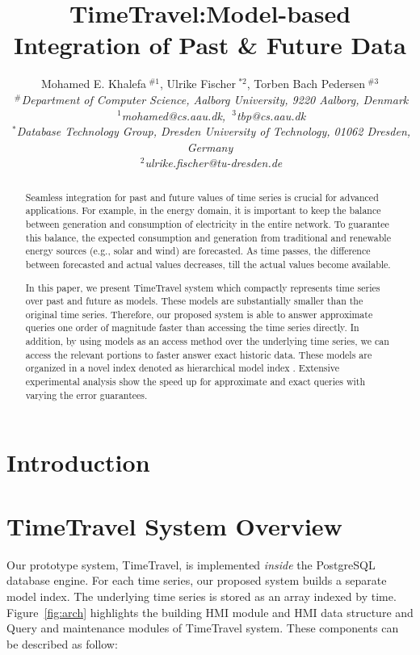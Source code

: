 \documentclass{sigmod}
\title{TimeTravel:Model-based Integration of Past \& Future Data}
\author{{Mohamed E. Khalefa{\small $~^{\#1}$}, Ulrike Fischer{\small $~^{*2}$}, Torben Bach Pedersen{\small $~^{\#3}$} }
\vspace{1.6mm}\\
\fontsize{10}{10}\selectfont\itshape
$~^{\#}$Department of Computer Science, Aalborg University, 9220 Aalborg, Denmark\\
\fontsize{9}{9}\selectfont\ttfamily\upshape
$~^{1}$mohamed@cs.aau.dk, 
$~^{3}$tbp@cs.aau.dk
\vspace{1.2mm}\\
\fontsize{10}{10}\selectfont\rmfamily\itshape
$~^{*}$Database Technology Group, Dresden University of Technology, 01062 Dresden, Germany\\
\fontsize{9}{9}\selectfont\ttfamily\upshape
$~^{2}$ulrike.fischer@tu-dresden.de
}
\newcommand{\LNs}{hierarchical model index }
\begin{document}
\maketitle
\begin{abstract}

Seamless integration for past and future values of time series is crucial for advanced applications. For example, in the energy domain, it is important to keep the balance between generation and consumption of electricity in the entire network. To guarantee this balance,  the expected consumption and generation from   traditional and  renewable energy sources  (e.g., solar and wind) are forecasted. As time  passes, the difference between  forecasted and actual values decreases, till the actual values become available.

In this paper, we present TimeTravel system which compactly represents time series over past and future as models. These models are substantially smaller than the original time series. Therefore, our proposed system is able to answer approximate queries one order of magnitude faster than  accessing the time series directly. In addition, by using models as an access method over the underlying time series, we can access the relevant portions to faster answer exact historic data. These models are organized in a novel index denoted as \LNs. Extensive experimental analysis show  the speed up for approximate and exact queries  with varying the error guarantees.
\end{abstract}
\section{Introduction}
  \label{sec:intro}

\section{TimeTravel System Overview}
\label{sec:overview}
Our prototype system, TimeTravel, is implemented {\em inside} the PostgreSQL database engine. For each time series, our proposed system builds a separate model index. The underlying  time series is stored as an array indexed by time.
Figure~\ref{fig:arch} highlights the building HMI module and HMI data structure and Query and maintenance modules of TimeTravel system. These components can be described as follow:
\end{document}

